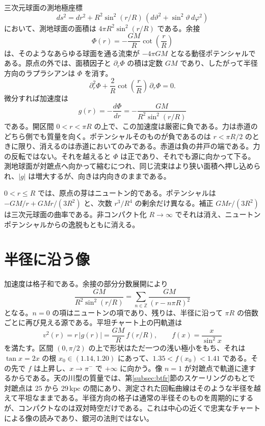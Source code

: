 \documentclass[a4paper]{article}
\begin{document}
三次元球面の測地極座標
\[
ds^2 = dr^2 + R^2 \sin^2(r/R)\,(d\vartheta^2 + \sin^2\!\vartheta\, d\varphi^2)
\]
において、測地球面の面積は $4\pi R^2\sin^2(r/R)$ である。余接
\[
\Phi(r) = -\frac{GM}{R}\cot\!\left(\frac{r}{R}\right)
\]
は、そのようなあらゆる球面を通る流束が $-4\pi GM$ となる動径ポテンシャルである。原点の外では、面積因子と $\partial_r\Phi$ の積は定数 $GM$ であり、したがって半径方向のラプラシアンは $\Phi$ を消す。
\[
\partial_r^2\Phi + \frac{2}{R}\cot\!\left(\frac{r}{R}\right)\,\partial_r\Phi = 0.
\]
微分すれば加速度は
\[
g(r) = -\frac{d\Phi}{dr} = -\frac{GM}{R^2\sin^2(r/R)}
\]
である。開区間 $0<r<\pi R$ の上で、この加速度は厳密に負である。力は赤道のどちら側でも質量を向く。ポテンシャルそのものが負であるのは $r<\pi R/2$ のときに限り、消えるのは赤道においてのみである。赤道は負の井戸の端である。力の反転ではない。それを越えると $\Phi$ は正であり、それでも源に向かって下る。測地球面が対蹠点へ向かって縮むにつれ、同じ流束はより狭い面積へ押し込められ、$|g|$ は増大するが、向きは内向きのままである。

$0<r\le R$ では、原点の芽はニュートン的である。ポテンシャルは $-GM/r + GMr/(3R^2)$ と、次数 $r^3/R^4$ の剰余だけ異なる。補正 $GMr/(3R^2)$ は三次元球面の曲率である。非コンパクト化 $R\to\infty$ でそれは消え、ニュートンポテンシャルからの逸脱もともに消える。

\section{半径に沿う像}
\label{sec:radial}

加速度は格子和である。余接の部分分数展開により
\[
\frac{GM}{R^2\sin^2(r/R)}=\sum_{n\in\mathbb{Z}}\frac{GM}{(r-n\pi R)^2}
\]
となる。$n=0$ の項はニュートンの項であり、残りは、半径に沿って $\pi R$ の倍数ごとに再び見える源である。平坦チャート上の円軌道は
\begin{equation}
\label{eq:s3-circular}
v^2(r) = r\,|g(r)| = \frac{GM}{R}\,f(r/R), \qquad f(x)=\frac{x}{\sin^2 x}
\end{equation}
を満たす。区間 $(0,\pi/2)$ の上で形状はただ一つの浅い極小をもち、それは $\tan x=2x$ の根 $x_0\in(1.14,1.20)$ にあって、$1.35<f(x_0)<1.41$ である。その先で $f$ は上昇し、$x\to\pi^-$ で $+\infty$ に向かう。像 $n=1$ が対蹠点で軌道に達するからである。天の川型の質量では、第\ref{subsec:btfr}節のスケーリングのもとで対蹠点は $25$ から $29\,\mathrm{kpc}$ の間にあり、測定された回転曲線はそのような半径を越えて平坦なままである。半径方向の格子は通常の半径そのものを周期的にするが、コンパクトなのは双対時空だけである。これは中心の近くで忠実なチャートによる像の読みであり、銀河の法則ではない。
\end{document}
